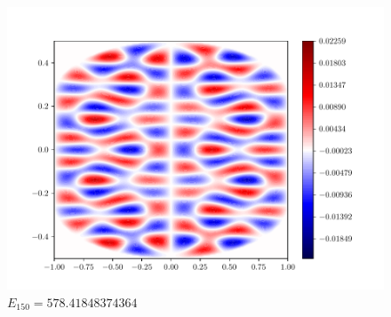 \documentclass{article}
\begin{document}
\begin{enumerate}[1.]
\begin{enumerate}[(A)]
\begin{enumerate}[(i)]
\begin{figure}[H]
\begin{minipage}{0.3\linewidth}
          \includegraphics[width=\linewidth]{q6c-150.pdf}
          \caption*{$E_{150}= 578.41848374364$}
        \end{minipage}


\end{figure}
\end{enumerate}
\end{enumerate}
\end{enumerate}
\end{document}

